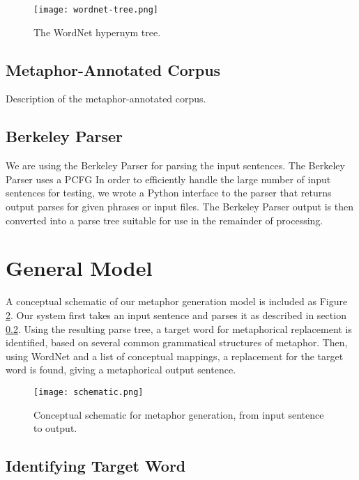 \documentclass[12pt]{article}
\begin{document}
\begin{figure}[h]
	\centering
	\texttt{[image: wordnet-tree.png]}
	\caption{The WordNet hypernym tree.}
	\label{fig:wordnettree}
\end{figure}

\subsection{Metaphor-Annotated Corpus}

Description of the metaphor-annotated corpus.

\subsection{Berkeley Parser}
\label{sec:berkeleyparser}

We are using the Berkeley Parser \cite{berkeleyparser} for parsing the input sentences.  The Berkeley Parser uses a PCFG
In order to efficiently handle the large number of input sentences for testing, we wrote a Python interface to the parser that returns output parses for given phrases or input files.  The Berkeley Parser output is then converted into a parse tree suitable for use in the remainder of processing.

\section{General Model}

A conceptual schematic of our metaphor generation model is included as Figure \ref{fig:schematic}.  Our system first takes an input sentence and parses it as described in section \ref{sec:berkeleyparser}.  Using the resulting parse tree, a target word for metaphorical replacement is identified, based on several common grammatical structures of metaphor.  Then, using WordNet and a list of conceptual mappings, a replacement for the target word is found, giving a metaphorical output sentence.

\begin{figure}[h]
	\centering
	\texttt{[image: schematic.png]}
	\caption{Conceptual schematic for metaphor generation, from input sentence to output.}
	\label{fig:schematic}
\end{figure}

\subsection{Identifying Target Word}
\end{document}
